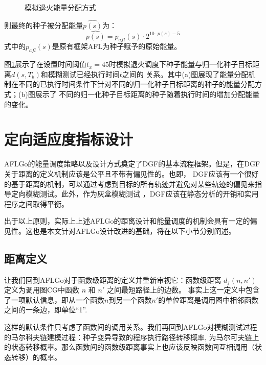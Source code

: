 \documentclass[bachelor]{njupthesis}
\begin{document}
\begin{figure}[htb]
	\centering
	\caption{模拟退火能量分配方式}
 	\label{pic:dis}
\end{figure}

则最终的种子被分配能量$\hat{p(s)}$为：
\begin{equation}
	\hat{p(s)}=p_{afl}(s)\cdot 2^{10\cdot p(s)-5}	
\end{equation}
式中的$p_{afl}(s)$是原有框架AFL为种子赋予的原始能量。

图\ref{pic:dis}展示了在设置时间阈值$t_x=45$时模拟退火调度下种子能量与归一化种子目标距离$d(s,T_b)$和模糊测试已经执行时间$t$之间的
关系。其中(a)图展现了能量分配机制在不同的已执行时间条件下针对不同的归一化种子目标距离的种子的能量分配方式；(b)图展示了
不同的归一化种子目标距离的种子随着执行时间的增加分配能量的变化。

\section{定向适应度指标设计}
AFLGo的能量调度策略以及设计方式奠定了DGF的基本流程框架。但是，在DGF关于距离的定义机制应该是公平且不带有偏见性的。也即，
DGF应该有一个很好的基于距离的机制，可以通过考虑到目标的所有轨迹并避免对某些轨迹的偏见来指导定向模糊测试。此外，作为灰盒模糊测试
，DGF应该在静态分析的开销和实用程序之间取得平衡。

出于以上原则，实际上上述AFLGo的距离设计和能量调度的机制会具有一定的偏见性。这也是本文针对AFLGo设计改进的基础，将在以下小节分别阐述。
\subsection{距离定义}
让我们回到AFLGo对于函数级距离的定义并重新审视它：函数级距离 $d_f(n, n')$ 定义为调用图CG中函数 $n$ 和 $n'$ 之间最短路径上的边数。
事实上这一定义中包含了一项默认信息，即从一个函数$n$到另一个函数$n'$的单位距离是调用图中相邻函数之间的一条边，即单位“1”.

这样的默认条件只考虑了函数间的调用关系。我们再回到AFLGo对模糊测试过程的马尔科夫链建模过程：种子变异导致的程序执行路径转移概率,
为马尔可夫链上的状态转移概率。那么函数间的函数级距离事实上也应该反映函数间互相调用（状态转移）的概率。
\end{document}
